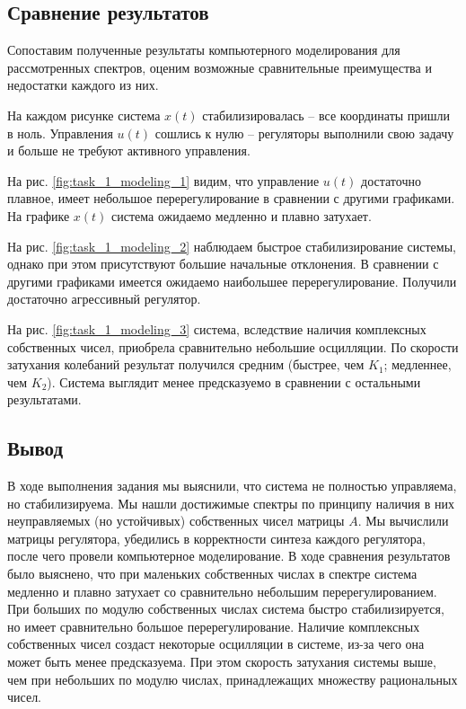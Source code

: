 \documentclass[a4paper, 12pt]{article}
\begin{document}
    \subsection{Сравнение результатов}
    Сопоставим полученные результаты компьютерного моделирования для рассмотренных спектров,
    оценим возможные сравнительные преимущества и недостатки каждого из них.


    На каждом рисунке система $x(t)$ стабилизировалась -- все координаты пришли в ноль.
    Управления $u(t)$ сошлись к нулю -- регуляторы выполнили свою задачу и больше не требуют
    активного управления.
    

    На рис. \ref{fig:task_1_modeling_1} видим, что управление $u(t)$ достаточно плавное,
    имеет небольшое перерегулирование в сравнении с другими графиками.
    На графике $x(t)$ система ожидаемо медленно и плавно затухает.


    На рис. \ref{fig:task_1_modeling_2} наблюдаем быстрое стабилизирование системы, однако при
    этом присутствуют большие начальные отклонения. В сравнении с другими графиками имеется
    ожидаемо наибольшее перерегулирование. Получили достаточно агрессивный регулятор.


    На рис. \ref{fig:task_1_modeling_3} система, вследствие наличия комплексных собственных чисел,
    приобрела сравнительно небольшие осцилляции. По скорости затухания колебаний результат получился средним
    (быстрее, чем $K_1$; медленнее, чем $K_2$). Система выглядит менее предсказуемо в сравнении с остальными результатами.


    \subsection{Вывод}
    В ходе выполнения задания мы выяснили, что система не полностью управляема, но стабилизируема.
    Мы нашли достижимые спектры по принципу наличия в них неуправляемых (но устойчивых) собственных чисел
    матрицы $A$. Мы вычислили матрицы регулятора, убедились в корректности синтеза каждого регулятора, после чего
    провели компьютерное моделирование. В ходе сравнения результатов было выяснено, что при маленьких собственных
    числах в спектре система медленно и плавно затухает со сравнительно небольшим перерегулированием. При больших
    по модулю собственных числах система быстро стабилизируется, но имеет сравнительно большое перерегулирование.
    Наличие комплексных собственных чисел создаст некоторые осцилляции в системе, из-за чего она может быть менее
    предсказуема. При этом скорость затухания системы выше, чем при небольших по модулю числах, принадлежащих множеству рациональных чисел.
\end{document}
